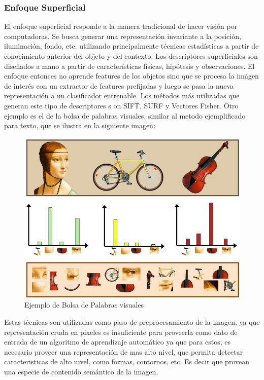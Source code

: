 \documentclass[a4paper,11pt,spanish]{book}
\begin{document}
	\subsubsection{Enfoque Superficial}
	  El enfoque superficial responde a la manera tradicional de hacer visión por computadoras. Se busca generar una representación invariante a la posición, iluminación, fondo,
	  etc. utilizando principalmente técnicas estadísticas a partir de conocimiento anterior del objeto y del contexto. Los descriptores superficiales son diseñados a mano a 
	  partir de características físicas, hipótesis y observaciones. El enfoque entonces no aprende features de los objetos sino que se procesa la imágen de interés con un 
	  extractor de features prefijadas y luego se pasa la nueva representación a un clasificador entrenable. Los métodos más utilizadas que generan este tipo de descriptores s
	  on SIFT, SURF y Vectores Fisher.
	  Otro ejemplo es el de la bolsa de palabras visuales, similar al metodo ejemplificado para texto, que se ilustra en la siguiente imagen:\\
	  \begin{figure}[h]
	    \includegraphics[scale=0.5]{./img/bag_of_visual_words.jpg}
	    \caption{Ejemplo de Bolsa de Palabras visuales}
	    \label{fig:figure2}
	  \end{figure}
	  
	  Estas técnicas son utilizadas como paso de preprocesamiento de la imagen, ya que representación cruda en pixeles es insuficiente para proveerla como dato de entrada de un algoritmo 
	  de aprendizaje automático ya que para estos, es necesario proveer una representación de mas alto nivel, que permita detectar caracteristicas de alto nivel,
	  como formas, contornos, etc. Es decir que provean una especie de contenido semántico de la imagen.
\end{document}
